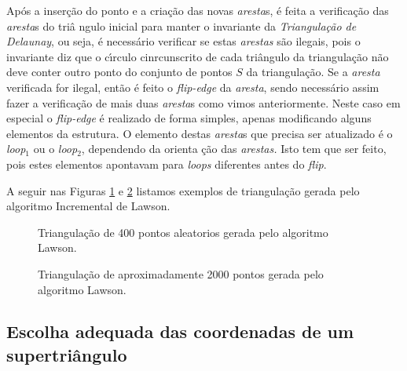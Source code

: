 \documentclass[12pt,a4paper]{book}
\begin{document}
Ap\'{o}s a inser\c{c}\~{a}o do ponto e a cria\c{c}\~{a}o das novas \textit{%
aresta}s, \'{e} feita a verifica\c{c}\~{a}o das \textit{aresta}s do tri\^{a}%
ngulo inicial para manter o invariante da \textit{Triangula\c{c}\~{a}o de
Delaunay}, ou seja, \'{e} necess\'{a}rio verificar se estas \textit{arestas}
s\~{a}o ilegais, pois o invariante diz que o c\'{\i}rculo cinrcunscrito de
cada tri\^{a}ngulo da triangula\c{c}\~{a}o n\~{a}o deve conter outro ponto
do conjunto de pontos $S$ da triangula\c{c}\~{a}o. Se a \textit{aresta}
verificada for ilegal, ent\~{a}o \'{e} feito o \textit{flip-edge} da \textit{aresta},
sendo necess\'{a}rio assim fazer a verifica\c{c}\~{a}o de mais duas \textit{%
aresta}s como vimos anteriormente. Neste caso em especial o \textit{flip-edge} \'{e}
realizado de forma simples, apenas modificando alguns elementos da
estrutura. O elemento destas \textit{aresta}s que precisa ser atualizado 
\'{e} o \textit{loop}$_{1}$ ou o \textit{loop}$_{2}$, dependendo da orienta%
\c{c}\~{a}o das \textit{arestas.} Isto tem que ser feito, pois estes
elementos apontavam para \textit{loops} diferentes antes do \emph{flip}.

A seguir nas Figuras \ref{fig6_1ch7} e \ref{fig6_2ch7} listamos exemplos de triangula\c{c}\~{a}o gerada pelo algoritmo Incremental de Lawson.

\begin{figure}[htbp]
  \begin{center}
    \leavevmode
    
    \caption{Triangula\c{c}\~{a}o de 400 pontos aleatorios gerada pelo algoritmo Lawson.}
    \label{fig6_1ch7}
  \end{center}
\end{figure}


\begin{figure}[htbp]
  \begin{center}
    \leavevmode
    
    \caption{Triangula\c{c}\~{a}o de aproximadamente 2000 pontos gerada pelo algoritmo Lawson.}
    \label{fig6_2ch7}
  \end{center}
\end{figure}


\subsection{Escolha adequada das coordenadas de um supertri\^angulo}
\end{document}

